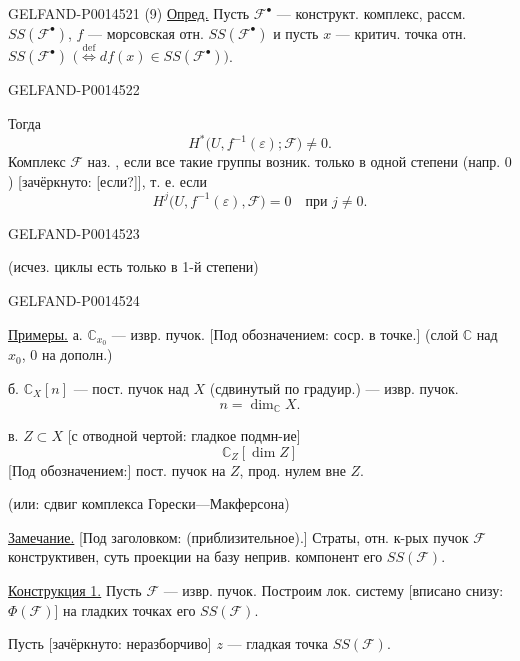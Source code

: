 \begin{GelfandAdjacentEvidence}{GELFAND-P001452}{1}
(9) \uline{Опред.}
Пусть \(\mathcal{F}^{\bullet}\) — конструкт. комплекс, рассм.
\(SS(\mathcal{F}^{\bullet})\), \(f\) — морсовская отн.
\(SS(\mathcal{F}^{\bullet})\) и пусть \(x\)
— критич. точка отн. \(SS(\mathcal{F}^{\bullet})\)
\(\bigl(\overset{\mathrm{def}}{\Longleftrightarrow}
df(x)\in SS(\mathcal{F}^{\bullet})\bigr)\).
\end{GelfandAdjacentEvidence}
\begin{GelfandAdjacentEvidence}{GELFAND-P001452}{2}

Тогда
\[
H^{*}\bigl(U,f^{-1}(\varepsilon);\mathcal{F}\bigr)\ne0.
\]
Комплекс \(\mathcal{F}\) наз. ,
если все такие группы возник. только в одной степени
(напр. \(0\)) [зачёркнуто: [если?]], т. е. если
\begin{equation*}
H^{j}\bigl(U,f^{-1}(\varepsilon),\mathcal{F}\bigr)=0
\quad\text{при }j\ne0. \tag{10}
\end{equation*}
\end{GelfandAdjacentEvidence}
\begin{GelfandAdjacentEvidence}{GELFAND-P001452}{3}

(исчез. циклы есть только в 1-й степени)
\end{GelfandAdjacentEvidence}
\begin{GelfandAdjacentEvidence}{GELFAND-P001452}{4}


\uline{Примеры.}
а. \(\mathbb C_{x_0}\) — извр. пучок.
[Под обозначением: соср. в точке.]
(слой \(\mathbb C\) над \(x_0\), \(0\) на дополн.)

б. \(\mathbb C_X[n]\) — пост. пучок над \(X\)
(сдвинутый по градуир.) — извр. пучок.
\[
n=\dim_{\mathbb C}X.
\]

в. \(Z\subset X\) [с отводной чертой: гладкое подмн-ие]
\[
\mathbb C_Z[\dim Z]
\]
[Под обозначением:] пост. пучок на \(Z\), прод. нулем вне \(Z\).

(или: сдвиг комплекса Горески—Макферсона)

\uline{Замечание.} [Под заголовком: (приблизительное).]
Страты, отн. к-рых пучок \(\mathcal F\) конструктивен, суть проекции на базу неприв. компонент его \(SS(\mathcal F)\).

\uline{Конструкция 1.}
Пусть \(\mathcal F\) — извр. пучок.
Построим лок. систему [вписано снизу: \(\Phi(\mathcal F)\)]
на гладких точках его \(SS(\mathcal F)\).

Пусть [зачёркнуто: неразборчиво]
\(z\) — гладкая точка \(SS(\mathcal F)\).
\end{GelfandAdjacentEvidence}
